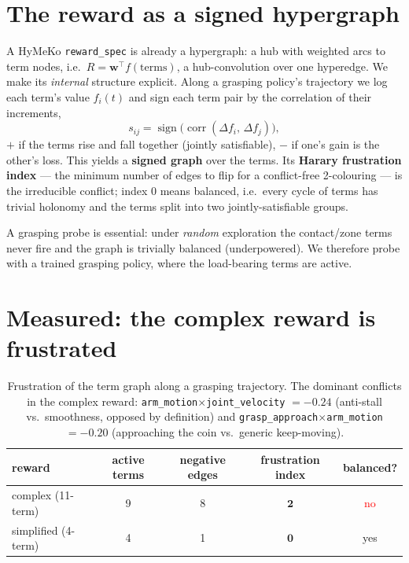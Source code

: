 \documentclass[11pt]{article}
\begin{document}
\section{The reward as a signed hypergraph}
A HyMeKo \texttt{reward\_spec} is already a hypergraph: a hub with weighted arcs to term nodes, i.e.\
$R = \mathbf{w}^\top f(\text{terms})$, a hub-convolution over one hyperedge. We make its \emph{internal} structure
explicit. Along a grasping policy's trajectory we log each term's value $f_i(t)$ and sign each term pair by the
correlation of their increments,
\[
  s_{ij} = \operatorname{sign}\big(\operatorname{corr}(\Delta f_i,\, \Delta f_j)\big),
\]
$+$ if the terms rise and fall together (jointly satisfiable), $-$ if one's gain is the other's loss. This yields
a \textbf{signed graph} over the terms. Its \textbf{Harary frustration index} --- the minimum number of edges to
flip for a conflict-free 2-colouring --- is the irreducible conflict; index $0$ means balanced, i.e.\ every cycle
of terms has trivial holonomy and the terms split into two jointly-satisfiable groups.

A grasping probe is essential: under \emph{random} exploration the contact/zone terms never fire and the graph is
trivially balanced (underpowered). We therefore probe with a trained grasping policy, where the load-bearing
terms are active.

\section{Measured: the complex reward is frustrated}
\begin{table}[h]
\centering
\begin{tabular}{lcccc}
\toprule
reward & active terms & negative edges & \textbf{frustration index} & balanced? \\
\midrule
complex (11-term) & 9 & 8 & $\mathbf{2}$ & \textcolor{red}{no} \\
simplified (4-term) & 4 & 1 & $\mathbf{0}$ & yes \\
\bottomrule
\end{tabular}
\caption{Frustration of the term graph along a grasping trajectory. The dominant conflicts in the complex reward:
\texttt{arm\_motion}$\times$\texttt{joint\_velocity} $=-0.24$ (anti-stall vs.\ smoothness, opposed by
definition) and \texttt{grasp\_approach}$\times$\texttt{arm\_motion} $=-0.20$ (approaching the coin vs.\ generic
keep-moving).}
\label{tab:frust}
\end{table}
\end{document}
